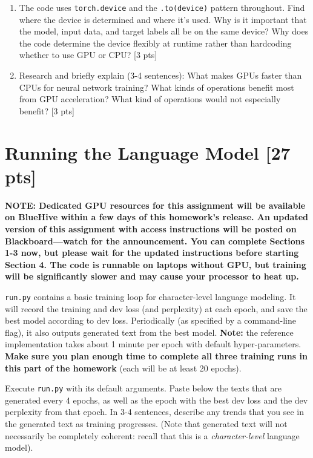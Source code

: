 \documentclass[11pt]{article}
\begin{document}
\vspace{2em}
\begin{enumerate}[label=\alph*., itemsep=2em]
  \item The code uses \texttt{torch.device} and the \texttt{.to(device)} pattern throughout. Find where the device is determined and where it's used. Why is it important that the model, input data, and target labels all be on the same device? Why does the code determine the device flexibly at runtime rather than hardcoding whether to use GPU or CPU? [3 pts]
  \item Research and briefly explain (3-4 sentences): What makes GPUs faster than CPUs for neural network training? What kinds of operations benefit most from GPU acceleration? What kind of operations would not especially benefit? [3 pts]
\end{enumerate}

\vspace{2em}
\section{Running the Language Model [27 pts]}

\textbf{NOTE: Dedicated GPU resources for this assignment will be available on BlueHive within a few days of this homework's release. An updated version of this assignment with access instructions will be posted on Blackboard—watch for the announcement. You can complete Sections 1-3 now, but please wait for the updated instructions before starting Section 4. The code is runnable on laptops without GPU, but training will be significantly slower and may cause your processor to heat up.}

\texttt{run.py} contains a basic training loop for character-level language modeling. It will record the training and dev loss (and perplexity) at each epoch, and save the best model according to dev loss.  Periodically (as specified by a command-line flag), it also outputs generated text from the best model. \textbf{Note:} the reference implementation takes about 1 minute per epoch with default hyper-parameters. \textbf{Make sure you plan enough time to complete all three training runs in this part of the homework} (each will be at least 20 epochs).

\vspace{2em}
 Execute \texttt{run.py} with its default arguments.  Paste below the texts that are generated every 4 epochs, as well as the epoch with the best dev loss and the dev perplexity from that epoch. In 3-4 sentences, describe any trends that you see in the generated text as training progresses. (Note that generated text will not necessarily be completely coherent: recall that this is a \emph{character-level} language model).
\end{document}
